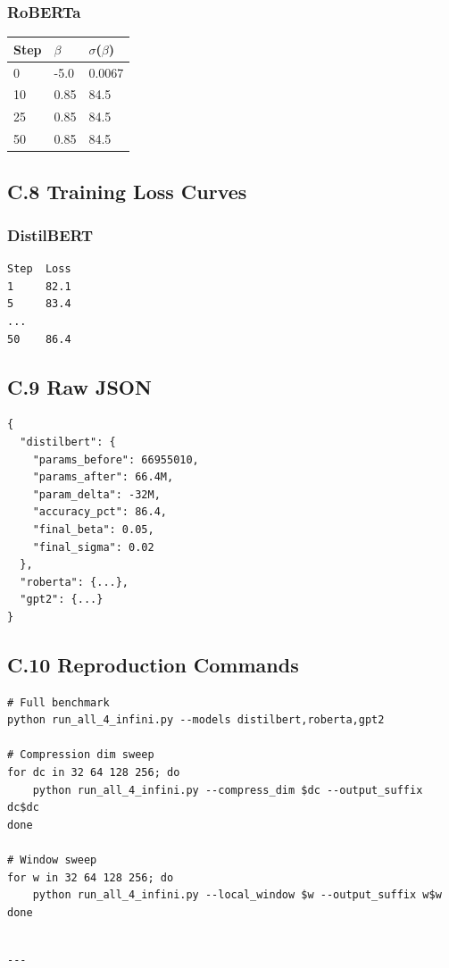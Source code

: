\subsubsection{RoBERTa}

\begin{table}[H]
\centering
\small
\begin{tabular}{lll}
\toprule
\textbf{Step} & \textbf{$\beta$} & \textbf{$\sigma$($\beta$)} \\
\midrule
0 & -5.0 & 0.0067 \\
10 & 0.85 & 84.5 \\
25 & 0.85 & 84.5 \\
50 & 0.85 & 84.5 \\
\bottomrule
\end{tabular}
\end{table}

\subsection{C.8 Training Loss Curves}

\subsubsection{DistilBERT}
\begin{lstlisting}
Step  Loss
1     82.1
5     83.4
...
50    86.4
\end{lstlisting}

\subsection{C.9 Raw JSON}

\begin{lstlisting}
{
  "distilbert": {
    "params_before": 66955010,
    "params_after": 66.4M,
    "param_delta": -32M,
    "accuracy_pct": 86.4,
    "final_beta": 0.05,
    "final_sigma": 0.02
  },
  "roberta": {...},
  "gpt2": {...}
}
\end{lstlisting}

\subsection{C.10 Reproduction Commands}

\begin{lstlisting}
# Full benchmark
python run_all_4_infini.py --models distilbert,roberta,gpt2

# Compression dim sweep
for dc in 32 64 128 256; do
    python run_all_4_infini.py --compress_dim $dc --output_suffix dc$dc
done

# Window sweep
for w in 32 64 128 256; do
    python run_all_4_infini.py --local_window $w --output_suffix w$w
done
\end{lstlisting}
\begin{lstlisting}

---
\end{lstlisting}


